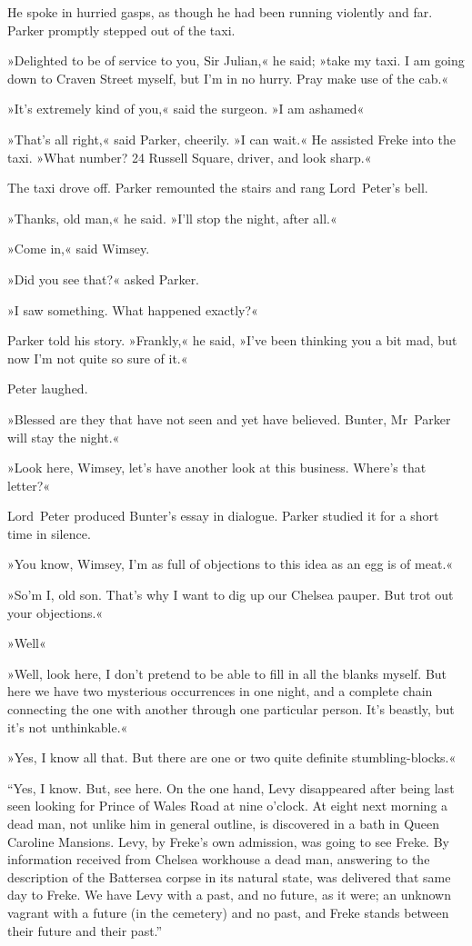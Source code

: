 He spoke in hurried gasps, as though he had been running violently and far. Parker promptly stepped out of the taxi.

»Delighted to be of service to you, Sir Julian,« he said; »take my taxi. I am going down to Craven Street myself, but I'm in no hurry. Pray make use of the cab.«

»It's extremely kind of you,« said the surgeon. »I am ashamed\longdash«

»That's all right,« said Parker, cheerily. »I can wait.« He assisted Freke into the taxi. »What number? 24 Russell Square, driver, and look sharp.«

The taxi drove off. Parker remounted the stairs and rang Lord~Peter's bell.

»Thanks, old man,« he said. »I'll stop the night, after all.«

»Come in,« said Wimsey.

»Did you see that?« asked Parker.

»I saw something. What happened exactly?«

Parker told his story. »Frankly,« he said, »I've been thinking you a bit mad, but now I'm not quite so sure of it.«

Peter laughed.

»Blessed are they that have not seen and yet have believed. Bunter, Mr~Parker will stay the night.«

»Look here, Wimsey, let's have another look at this business. Where's that letter?«

Lord~Peter produced Bunter's essay in dialogue. Parker studied it for a short time in silence.

»You know, Wimsey, I'm as full of objections to this idea as an egg is of meat.«

»So'm I, old son. That's why I want to dig up our Chelsea pauper. But trot out your objections.«

»Well\longdash«

»Well, look here, I don't pretend to be able to fill in all the blanks myself. But here we have two mysterious occurrences in one night, and a complete chain connecting the one with another through one particular person. It's beastly, but it's not unthinkable.«

»Yes, I know all that. But there are one or two quite definite stumbling-blocks.«

“Yes, I know. But, see here. On the one hand, Levy disappeared after being last seen looking for Prince of Wales Road at nine o'clock. At eight next morning a dead man, not unlike him in general outline, is discovered in a bath in Queen Caroline Mansions. Levy, by Freke's own admission, was going to see Freke. By information received from Chelsea workhouse a dead man, answering to the description of the Battersea corpse in its natural state, was delivered that same day to Freke. We have Levy with a past, and no future, as it were; an unknown vagrant with a future (in the cemetery) and no past, and Freke stands between their future and their past.”

